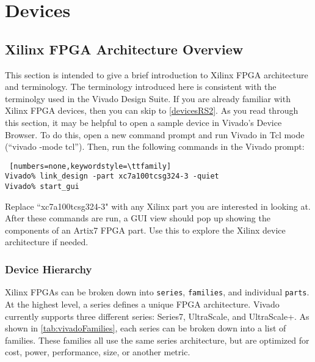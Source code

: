\newpage
\section{Devices}

\subsection{Xilinx FPGA Architecture Overview} \label{fpgaArch}
This section is intended to give a brief introduction to Xilinx FPGA
architecture and terminology. The terminology introduced here is consistent
with the terminolgy used in the Vivado Design Suite. If you are already familiar
with Xilinx FPGA devices, then you can skip to \autoref{devicesRS2}. 
As you read through this section, it may be helpful to open a sample device in Vivado's
Device Browser. To do this, open a new command prompt and run Vivado in Tcl mode
(``vivado -mode tcl''). Then, run the following commands in the Vivado prompt:

\begin{lstlisting} [numbers=none,keywordstyle=\ttfamily]
Vivado% link_design -part xc7a100tcsg324-3 -quiet
Vivado% start_gui
\end{lstlisting}

\noindent
Replace ``xc7a100tcsg324-3" with any Xilinx part you are interested in looking
at. After these commands are run, a GUI view should pop up showing the
components of an Artix7 FPGA part. Use this to explore the Xilinx device 
architecture if needed.

\subsubsection{Device Hierarchy} \label{sec:deviceHierarchy}
Xilinx FPGAs can be broken down into \texttt{series},
\texttt{families}, and individual \texttt{parts}. At the highest level, a series
defines a unique FPGA architecture. Vivado currently supports three different
series: Series7, UltraScale, and UltraScale+. As shown in
\autoref{tab:vivadoFamilies}, each series can be broken down into a list of
families. These families all use the same series architecture, but are
optimized for cost, power, performance, size, or another metric.

